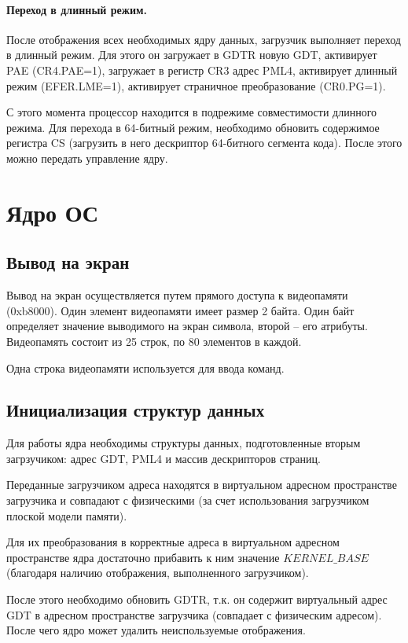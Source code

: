 \paragraph{Переход в длинный режим.} После отображения всех необходимых ядру данных,
загрузчик выполняет переход в длинный режим. Для этого он загружает в GDTR новую GDT,
активирует PAE (CR4.PAE=1), загружает в регистр CR3 адрес PML4, активирует длинный режим
(EFER.LME=1), активирует страничное преобразование (CR0.PG=1).

С этого момента процессор находится в подрежиме совместимости длинного режима.
Для перехода в 64-битный режим, необходимо обновить содержимое регистра CS (загрузить в
него дескриптор 64-битного сегмента кода). После этого можно передать управление ядру.

\section{Ядро ОС}

\subsection{Вывод на экран}
Вывод на экран осуществляется путем прямого доступа к видеопамяти (0xb8000). Один элемент
видеопамяти имеет размер 2 байта. Один байт определяет значение выводимого на экран символа,
второй -- его атрибуты. Видеопамять состоит из 25 строк, по 80 элементов в каждой.

Одна строка видеопамяти используется для ввода команд.

\subsection{Инициализация структур данных}
Для работы ядра необходимы структуры данных, подготовленные вторым загрзучиком:
адрес GDT, PML4 и массив дескрипторов страниц.

Переданные загрузчиком адреса находятся в виртуальном адресном пространстве загрузчика
и совпадают с физическими (за счет использования загрузчиком плоской модели памяти).

Для их преобразования в корректные адреса в виртуальном адресном пространстве ядра
достаточно прибавить к ним значение $KERNEL\_BASE$ (благодаря наличию отображения,
выполненного загрузчиком).

После этого необходимо обновить GDTR, т.к. он содержит виртуальный адрес GDT в адресном
пространстве загрузчика (совпадает с физическим адресом). После чего ядро может удалить
неиспользуемые отображения.

